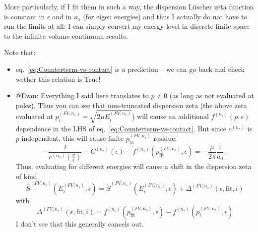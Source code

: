 \documentclass[aps,superscriptaddress,tightenlines,nofootinbib,floatfix,longbibliography,notitlepage]{revtex4-1}
\begin{document}
More particularly, if I fit them in such a way, the dispersion Lüscher zeta function is constant in $\epsilon$ and in $n_s$ (for eigen energies) and thus I actually do not have to run the limits at all: I can simply convert my energy level in discrete finite space to the infinite volume continuum results.

Note that:
\begin{itemize}
	\item eq.~\ref{eq:Counterterm-vs-contact} is a prediction -- we can go back and check wether this relation is True!
	\item @Evan: Everything I said here translates to $p \neq 0$ (as long as not evaluated at poles).
		Thus you can see that non-truncated dispersion zeta (the above zeta evaluated at $p_i^{(FV, n_s)} = \sqrt{2 \mu E_i^{(FV, n_s)}}$) will cause an additional $f^{(n_s)}(p, \epsilon)$ dependence in the LHS of eq.~\ref{eq:Counterterm-vs-contact}.
		But since $c^{(n_s)}$ is $p$ independent, this will cause finite $p_\text{fit}^{(FV, n_s)}$ residue:
		$$
			- \frac{1}{c^{(n_s)}(\frac{\pi}{\epsilon})} - C^{(n_s)}(\epsilon)  - f^{(n_s)}(p_\text{fit}^{(FV, n_s)}, \epsilon)= - \frac{\mu}{2 \pi} \frac{1}{a_0} \, .
		$$
		Thus, evaluating for different energies will cause a shift in the dispersion zeta of kind
		$$
			\hat S^{(FV, n_s)}(E_i^{(FV, n_s)}, \epsilon)
			=
			\tilde S^{(FV, n_s)}(E_i^{(FV, n_s)}, \epsilon)
			+
			\Delta^{(FV, n_s)}(\epsilon, \text{fit}, i)
		$$
		with
		$$
			\Delta^{(FV, n_s)}(\epsilon, \text{fit}, i)
			=
			f^{(n_s)}(p_\text{fit}^{(FV, n_s)}, \epsilon)
			-
			f^{(n_s)}(p_i^{(FV, n_s)}, \epsilon)
		$$
		I don't see that this generally cancels out.
\end{itemize}
\end{document}
